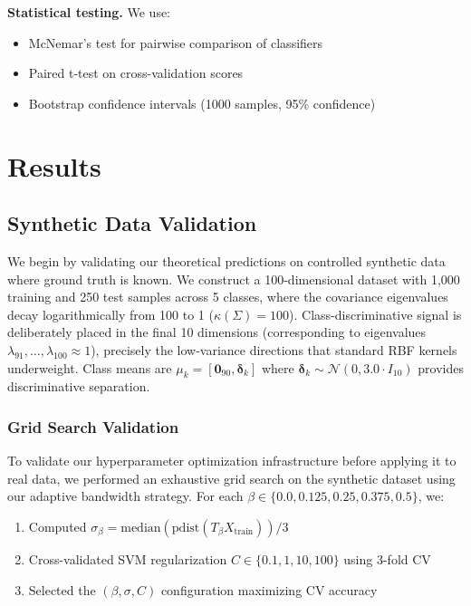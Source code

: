 \documentclass[11pt]{article}
\begin{document}
\textbf{Statistical testing.} We use:
\begin{itemize}
    \item McNemar's test for pairwise comparison of classifiers
    \item Paired t-test on cross-validation scores
    \item Bootstrap confidence intervals (1000 samples, 95\% confidence)
\end{itemize}

\section{Results}

\subsection{Synthetic Data Validation}

We begin by validating our theoretical predictions on controlled synthetic data where ground truth is known. We construct a 100-dimensional dataset with 1,000 training and 250 test samples across 5 classes, where the covariance eigenvalues decay logarithmically from 100 to 1 ($\kappa(\Sigma) = 100$). Class-discriminative signal is deliberately placed in the final 10 dimensions (corresponding to eigenvalues $\lambda_{91}, \ldots, \lambda_{100} \approx 1$), precisely the low-variance directions that standard RBF kernels underweight. Class means are $\mu_k = [\mathbf{0}_{90}, \boldsymbol{\delta}_k]$ where $\boldsymbol{\delta}_k \sim \mathcal{N}(0, 3.0 \cdot I_{10})$ provides discriminative separation.

\subsubsection{Grid Search Validation}

To validate our hyperparameter optimization infrastructure before applying it to real data, we performed an exhaustive grid search on the synthetic dataset using our adaptive bandwidth strategy. For each $\beta \in \{0.0, 0.125, 0.25, 0.375, 0.5\}$, we:
\begin{enumerate}
    \item Computed $\sigma_\beta = \text{median}(\text{pdist}(T_\beta X_{\text{train}})) / 3$
    \item Cross-validated SVM regularization $C \in \{0.1, 1, 10, 100\}$ using 3-fold CV
    \item Selected the $(\beta, \sigma, C)$ configuration maximizing CV accuracy
\end{enumerate}
\end{document}
